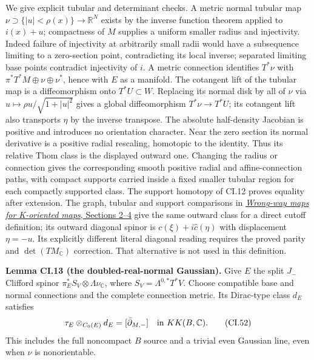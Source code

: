 \documentclass[
  11pt,
]{article}
\begin{document}
We give explicit tubular and determinant checks. A metric normal tubular
map \(\nu\supset\{|u|<\rho(x)\}\to\mathbb R^N\) exists by the inverse
function theorem applied to \(i(x)+u\); compactness of \(M\) supplies a
uniform smaller radius and injectivity. Indeed failure of injectivity at
arbitrarily small radii would have a subsequence limiting to a
zero-section point, contradicting its local inverse; separated limiting
base points contradict injectivity of \(i\). A metric connection
identifies \(T^*\nu\) with \(\pi^*T^*M\oplus\nu\oplus\nu^*\), hence with
\(E\) as a manifold. The cotangent lift of the tubular map is a
diffeomorphism onto \(T^*U\subset W\). Replacing its normal disk by all
of \(\nu\) via \(u\mapsto\rho u/\sqrt{1+|u|^2}\) gives a global
diffeomorphism \(T^*\nu\to T^*U\); its cotangent lift also transports
\(\eta\) by the inverse transpose. The absolute half-density Jacobian is
positive and introduces no orientation character. Near the zero section
its normal derivative is a positive radial rescaling, homotopic to the
identity. Thus its relative Thom class is the displayed outward one.
Changing the radius or connection gives the corresponding smooth
positive radial and affine-connection paths, with compact supports
carried inside a fixed smaller tubular region for each compactly
supported class. The support homotopy of CI.12 proves equality after
extension. The graph, tubular and support comparisons in
\href{KT-KK-16.html\#3-graph-symbols-and-bounded-families}{\emph{Wrong-way
maps for K-oriented maps}, Sections 2--4} give the same outward class
for a direct cutoff definition; its outward diagonal spinor is
\(c(\xi)+i\widehat c(\eta)\) with displacement \(\eta=-u\). Its
explicitly different literal diagonal reading requires the proved parity
and \(\det(TM_{\mathbb C})\) correction. That alternative is not used in
this definition.

\textbf{Lemma CI.13 (the doubled-real-normal Gaussian).} Give \(E\) the
split \(J_-\) Clifford spinor
\(\pi_E^*S_V\widehat\otimes\Lambda\nu_{\mathbb C}\), where
\(S_V=\Lambda^{0,*}T^*V\). Choose compatible base and normal connections
and the complete connection metric. Its Dirac-type class \(d_E\)
satisfies \[
 \tau_E\otimes_{C_0(E)}d_E=[\bar\partial_{M,-}]
                               \quad\hbox{in }KK(B,\mathbb C).
 \tag{CI.52}
\] This includes the full noncompact \(B\) source and a trivial even
Gaussian line, even when \(\nu\) is nonorientable.
\end{document}
